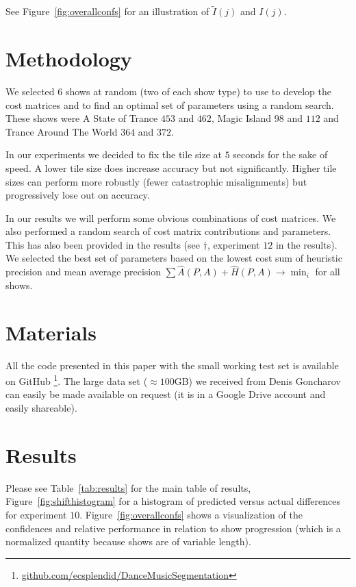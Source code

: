 \documentclass[twocolumn]{article}
\begin{document}
See Figure~\ref{fig:overallconfs} for an illustration of $\tilde I( j )$ and $I( j )$.

\section{Methodology}\label{sec:methodology}

We selected $6$ shows at random (two of each show type) to use to develop the cost matrices and to find an optimal set of parameters using a random search. These shows were A State of Trance $453$ and $462$, Magic Island $98$ and $112$ and Trance Around The World $364$ and $372$.  

In our experiments we decided to fix the tile size at $5$ seconds for the sake of speed. A lower tile size does increase accuracy but not significantly. Higher tile sizes can perform more robustly (fewer catastrophic misalignments) but progressively lose out on accuracy.

In our results we will perform some obvious combinations of cost matrices. We also performed a random search of cost matrix contributions and parameters. This has also been provided in the results (see $\dagger$, experiment $12$ in the results). We selected the best set of parameters based on the lowest cost sum of heuristic precision and mean average precision $\sum \hat A(P,A) + \hat H(P,A) \rightarrow \min_i$ for all shows. 

\section{Materials}\label{sec:materials}

All the code presented in this paper with the small working test set is available on GitHub \footnote{\url{github.com/ecsplendid/DanceMusicSegmentation}}. The large data set ($\approx100$GB) we received from Denis Goncharov can easily be made available on request (it is in a Google Drive account and easily shareable).

\section{Results}\label{sec:results}

Please see Table~\ref{tab:results} for the main table of results, Figure~\ref{fig:shifthistogram} for a histogram of predicted versus actual differences for experiment $10$. Figure~\ref{fig:overallconfs} shows a visualization of the confidences and relative performance in relation to show progression (which is a normalized quantity because shows are of variable length).
\end{document}
